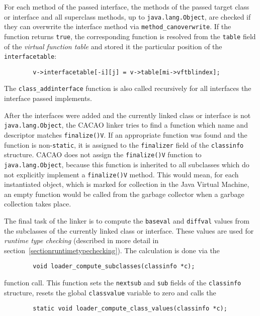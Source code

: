 For each method of the passed interface, the methods of the passed
target class or interface and all superclass methods, up to
\texttt{java.lang.Object}, are checked if they can overwrite the
interface method via \texttt{method\_canoverwrite}. If the function
returns \texttt{true}, the corresponding function is resolved from the
\texttt{table} field of the \textit{virtual function table} and stored
it the particular position of the \texttt{interfacetable}:

\begin{verbatim}
        v->interfacetable[-i][j] = v->table[mi->vftblindex];
\end{verbatim}

The \texttt{class\_addinterface} function is also called recursively
for all interfaces the interface passed implements.

After the interfaces were added and the currently linked class or
interface is not \texttt{java.lang.Object}, the CACAO linker tries to
find a function which name and descriptor matches
\texttt{finalize()V}. If an appropriate function was found and the
function is non-\texttt{static}, it is assigned to the
\texttt{finalizer} field of the \texttt{classinfo} structure. CACAO
does not assign the \texttt{finalize()V} function to
\texttt{java.lang.Object}, because this function is inherited to all
subclasses which do not explicitly implement a \texttt{finalize()V}
method. This would mean, for each instantiated object, which is marked
for collection in the Java Virtual Machine, an empty function would be
called from the garbage collector when a garbage collection takes
place.

The final task of the linker is to compute the \texttt{baseval} and
\texttt{diffval} values from the subclasses of the currently linked
class or interface. These values are used for \textit{runtime type
checking} (described in more detail in
section~\ref{sectionruntimetypechecking}). The calculation is done via
the

\begin{verbatim}
        void loader_compute_subclasses(classinfo *c);
\end{verbatim}

function call. This function sets the \texttt{nextsub} and
\texttt{sub} fields of the \texttt{classinfo} structure, resets the
global \texttt{classvalue} variable to zero and calls the

\begin{verbatim}
        static void loader_compute_class_values(classinfo *c);
\end{verbatim}

